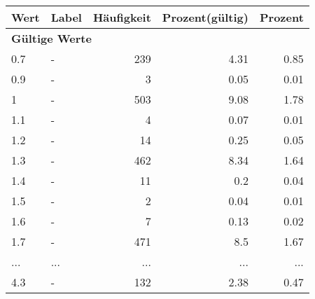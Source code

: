      \begin{longtable}{lXrrr}
     \toprule
     \textbf{Wert} & \textbf{Label} & \textbf{Häufigkeit} & \textbf{Prozent(gültig)} & \textbf{Prozent} \\
     \endhead
     \midrule
     \multicolumn{5}{l}{\textbf{Gültige Werte}}\\
        0.7 & \multicolumn{1}{X}{-} & %
          \num{239} &
          \num[round-mode=places,round-precision=2]{4,31} &
          \num[round-mode=places,round-precision=2]{0,85} \\
        0.9 & \multicolumn{1}{X}{-} & %
          \num{3} &
          \num[round-mode=places,round-precision=2]{0,05} &
          \num[round-mode=places,round-precision=2]{0,01} \\
        1 & \multicolumn{1}{X}{-} & %
          \num{503} &
          \num[round-mode=places,round-precision=2]{9,08} &
          \num[round-mode=places,round-precision=2]{1,78} \\
        1.1 & \multicolumn{1}{X}{-} & %
          \num{4} &
          \num[round-mode=places,round-precision=2]{0,07} &
          \num[round-mode=places,round-precision=2]{0,01} \\
        1.2 & \multicolumn{1}{X}{-} & %
          \num{14} &
          \num[round-mode=places,round-precision=2]{0,25} &
          \num[round-mode=places,round-precision=2]{0,05} \\
        1.3 & \multicolumn{1}{X}{-} & %
          \num{462} &
          \num[round-mode=places,round-precision=2]{8,34} &
          \num[round-mode=places,round-precision=2]{1,64} \\
        1.4 & \multicolumn{1}{X}{-} & %
          \num{11} &
          \num[round-mode=places,round-precision=2]{0,2} &
          \num[round-mode=places,round-precision=2]{0,04} \\
        1.5 & \multicolumn{1}{X}{-} & %
          \num{2} &
          \num[round-mode=places,round-precision=2]{0,04} &
          \num[round-mode=places,round-precision=2]{0,01} \\
        1.6 & \multicolumn{1}{X}{-} & %
          \num{7} &
          \num[round-mode=places,round-precision=2]{0,13} &
          \num[round-mode=places,round-precision=2]{0,02} \\
        1.7 & \multicolumn{1}{X}{-} & %
          \num{471} &
          \num[round-mode=places,round-precision=2]{8,5} &
          \num[round-mode=places,round-precision=2]{1,67} \\
       ... & ... & ... & ... & ... \\
        4.3 & \multicolumn{1}{X}{-} & %
          \num{132} &
          \num[round-mode=places,round-precision=2]{2,38} &
          \num[round-mode=places,round-precision=2]{0,47} \\


\end{longtable}

